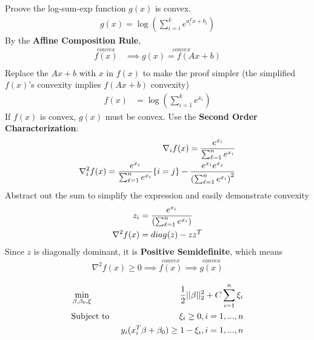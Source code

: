 \documentclass{article}
\begin{document}
\begin{headered_note}
  Proove the log-sum-exp function $g(x)$ is convex.
  \begin{align}
    g(x)=\log \left(\sum_{i=i}^ke^{a_i^Tx+b_i}\right)
  \end{align}
  By the \textbf{Affine Composition Rule},
  \begin{align}
    \stackrel{convex}{f(x)} & \implies \stackrel{convex}{g(x)=f(Ax+b)} \\
  \end{align}
  Replace the $Ax+b$ with $x$ in $f(x)$ to make the proof simpler (the
  simplified $f(x)$'s convexity implies $f(Ax+b)$ convexity)
  \begin{align}
    f(x) & =\log \left(\sum_{i=1}^k e^{x_i}\right)
  \end{align}
  If $f(x)$ is convex, $g(x)$ must be convex.  Use the \textbf{Second Order Characterization}:
  \begin{align}
    \nabla_if(x)={e^{x_i}\over \sum_{\ell=1}^n e^{x_i}} \\
    \nabla_i^2f(x)={e^{x_i}\over \sum_{\ell=1}^n e^{x_i}}\{i=j\}-{e^{x_i}e^{x_j}\over \left(\sum_{\ell=1}^ne^{x_i}\right)^2}
  \end{align}
  Abstract out the sum to simplify the expression and easily demonstrate convexity
  \begin{align}
    z_i          & ={e^{x_i}\over \left(\sum_{\ell=1}^ne^{x_i}\right)} \\
    \nabla^2f(x) & =diag(z)-zz^T
  \end{align}
  Since $z$ is diagonally dominant, it is \textbf{Positive Semidefinite}, which means
  \begin{align}
    \nabla^2f(x)\geq 0\implies \stackrel{convex}{f(x)}\implies \stackrel{convex}{g(x)}
  \end{align}
\end{headered_note}
\begin{headered_note}
  \begin{align}
     & \min_{\beta,\beta_0,\xi} & {1\over 2}||\beta||_2^2+C\sum_{i=1}^n\xi_i     \\
    \nonumber
     & \text{Subject to }       & \xi_i\geq 0,i=1,...,n                          \\
    \nonumber
     &                          & y_i(x_i^T\beta +\beta_0)\geq 1-\xi_i,i=1,...,n
  \end{align}
\end{headered_note}
\end{document}
